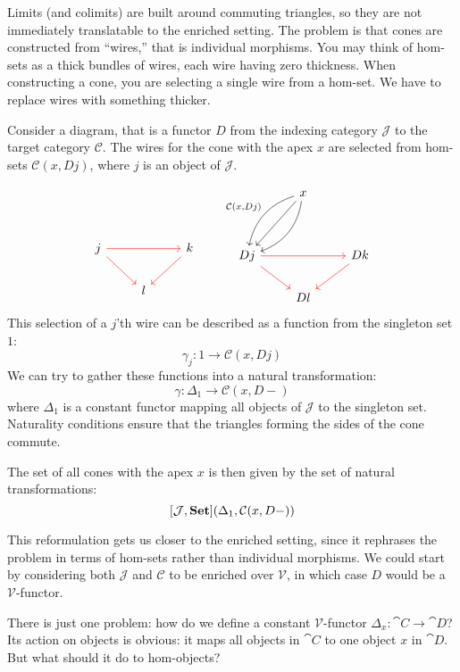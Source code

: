 \documentclass[DaoFP]{subfiles}
\begin{document}
Limits (and colimits) are built around commuting triangles, so they are not immediately translatable to the enriched setting. The problem is that cones are constructed from ``wires,'' that is individual morphisms. You may think of hom-sets as a thick bundles of wires, each wire having zero thickness. When constructing a cone, you are selecting a single wire from a hom-set. We have to replace wires with something thicker.

Consider a diagram, that is a functor $D$ from the indexing category $\mathcal J$ to the target category $\mathcal C$. The wires for the cone with the apex $x$ are selected from hom-sets $\mathcal C(x, D j)$, where $j$ is an object of $\mathcal J$. 

\[
 \begin{tikzcd}
 \\
 \\
j
\arrow[rr, red]
\arrow[rd, red]
&& k
\arrow[dl, red]
\\
& l
 \end{tikzcd}
 \qquad
 \begin{tikzcd}
  & x
 \arrow[ddl, ""']
 \arrow[ddl, bend right, "{\mathcal C(x, D j)}"']
 \arrow[ddl, bend left, ""]
 \\
\\
D j
\arrow[rr, red]
\arrow[rd, red]
&& D k
\arrow[dl, red]
\\
& D l
 \end{tikzcd}
 \]
This selection of a $j$'th wire can be described as a function from the singleton set $1$:
\[ \gamma_j \colon 1 \to \mathcal C(x, D j) \]
We can try to gather these functions into a natural transformation:
\[ \gamma \colon \Delta_1 \to \mathcal C(x, D -) \]
where $\Delta_1$ is a constant functor mapping all objects of $\mathcal J$ to the singleton set. Naturality conditions ensure that the triangles forming the sides of the cone commute. 

The set of all cones  with the apex $x$ is then given by the set of natural transformations:
\[ [\mathcal J, \mathbf{Set}] (\Delta_1, \mathcal C(x, D-)) \]

This reformulation gets us closer to the enriched setting, since it rephrases the problem in terms of hom-sets rather than individual morphisms. We could start by considering both $\mathcal J$ and $\mathcal C$ to be enriched over $\mathcal V$, in which case $D$ would be a $\mathcal V$-functor. 

There is just one problem: how do we define a constant $\mathcal V$-functor $\Delta_x \colon \cat C \to \cat D$? Its action on objects is obvious:  it maps all objects in $\cat C$ to one object $x$ in $\cat D$. But what should it do to hom-objects? 
\end{document}
